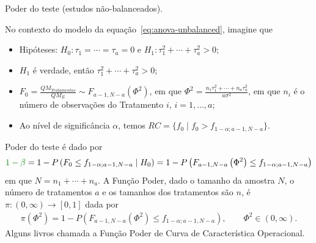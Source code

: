 \documentclass[8pt]{beamer}
\begin{document}
\begin{frame}{Poder do teste (estudos não-balanceados).}


No contexto do modelo da equação~\eqref{eq:anova-unbalanced}, imagine que
\begin{itemize}
	\item Hipóteses: $H_0: \tau_1=\cdots=\tau_a=0$ e $H_1: \tau_1^2 + \cdots + \tau_a^2 > 0$;
	\item $H_1$ é verdade, então $\tau_1^2 + \cdots + \tau_a^2 > 0$;
	\item $F_0 = \frac{QM_{Tratamentos}}{QM_E} \sim F_{a-1, N-a}\left(\Phi^2\right)$, em que $\Phi^2 = \frac{n_1 \tau_1^2 + \cdots + n_a \tau_a^2}{a \sigma^2}$, em que $n_i$ é o número de observações do  Tratamento $i$, $i=1, \dots, a$;
	\item Ao nível de significância $\alpha$, temos $RC = \{ f_0 \mid f_0 > f_{1-\alpha;a-1, N-a}  \}$.
\end{itemize}

Poder do teste é dado por
\begin{align*}
\textcolor{important}{1-\beta}  = 1 - P\left( F_0 \leq f_{1-\alpha;a-1, N-a} \mid H_0 \right) = 1- P\left( F_{a-1, N-a}\left( \Phi^2 \right) \leq f_{1-\alpha;a-1, N-a}  \right)
\end{align*}
em que $N = n_1 + \cdots + n_a$. A \textcolor{important}{Função Poder}, dado o tamanho da amostra $N$, o número de tratamentos $a$ e os tamanhos dos tratamentos são $n$, é  $\pi: (0, \infty) \longrightarrow [0,1]$ dada por
\begin{align*}
\pi(\Phi^2) = 1- P\left( F_{a-1, N-a}\left( \Phi^2\right) \leq f_{1-\alpha;a-1, N-a}  \right), \qquad \Phi^2 \in (0,\infty).
\end{align*}
Alguns livros chamada a Função Poder de \textcolor{important}{Curva de Característica Operacional.}
\end{frame}
\end{document}
